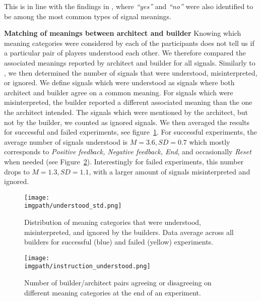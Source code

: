This is in line with the findings in \cite{griffiths2012bottom}, where \emph{``yes''} and \emph{``no''} were also identified to be among the most common types of signal meanings.

\textbf{Matching of meanings between architect and builder} Knowing which meaning categories were considered by each of the participants does not tell us if a particular pair of players understood each other. We therefore compared the associated meanings reported by architect and builder for all signals. Similarly to \cite{griffiths2012bottom}, we then determined the number of signals that were understood, misinterpreted, or ignored. We define signals which were understood as signals where both architect and builder agree on a common meaning. For signals which were misinterpreted, the builder reported a different associated meaning than the one the architect intended. The signals which were mentioned by the architect, but not by the builder, we counted as ignored signals. We then averaged the results for successful and failed experiments, see figure~\ref{fig:types_of_understanding}. For successful experiments, the average number of signals understood is $M = 3.6, SD = 0.7$ which mostly corresponds to \emph{Positive feedback, Negative feedback, End}, and occasionally \emph{Reset} when needed (see Figure~\ref{fig:understanding_per_feedback}). Interestingly for failed experiments, this number drops to $M = 1.3, SD = 1.1$, with a larger amount of signals misinterpreted and ignored.

\begin{figure}[!ht]
    \begin{center}
      \texttt{[image: \\imgpath/understood\_std.png]}
        \caption{Distribution of meaning categories that were understood, misinterpreted, and ignored by the builders. Data average across all builders for successful (blue) and failed (yellow) experiments.}
      \label{fig:types_of_understanding}
    \end{center}
\end{figure}

\begin{figure}[!ht]
  \begin{center}
      \texttt{[image: \\imgpath/instruction\_understood.png]}
      \caption{Number of builder/architect pairs agreeing or disagreeing on different meaning categories at the end of an experiment.}
    \label{fig:understanding_per_feedback}
    \end{center}
\end{figure}

